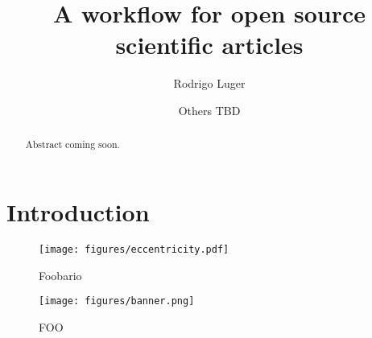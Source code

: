\documentclass[twocolumn]{aastex631}
\begin{document}
\title{A workflow for open source scientific articles}

\author[0000-0002-0296-3826]{Rodrigo Luger}
\author{Others TBD}

\begin{abstract}
    Abstract coming soon.
\end{abstract}

\section{Introduction}
\label{sec:intro}

\begin{figure}[ht!]
    \begin{centering}
        \texttt{[image: figures/eccentricity.pdf]}
        \caption{Foobario}
        \label{fig:eccentricity}
    \end{centering}
\end{figure}

\begin{figure}[th!]
    \begin{centering}
        \texttt{[image: figures/banner.png]}
        \caption{FOO}
        \label{fig:banner}
    \end{centering}
\end{figure}


\end{document}
